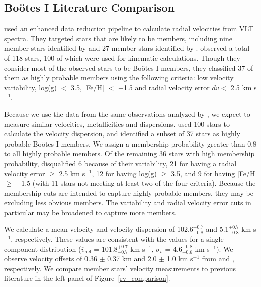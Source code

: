 \documentclass[twocolumn]{aastex63}
\newcommand{\revise}[1]{#1}
\begin{document}
\subsection{Bo{\"o}tes I Literature Comparison}
\label{sec:bootes_literature}
\citet{kop2011} used an enhanced data reduction pipeline to calculate radial velocities from VLT spectra. They targeted stars that are likely to be members, including nine member stars identified by \citet{mun2006} and 27 member stars identified by \citet{Mar2007}. \citet{kop2011} observed a total of 118 stars, 100 of which were used for kinematic calculations. Though they consider most of the observed stars to be Bo{\"o}tes I members, they classified 37 of them as highly probable members using the following criteria: low velocity variability, log(g) $<$ 3.5, [Fe/H] $<$ $-$1.5 and radial velocity error $dv <$ 2.5 km s$^{-1}$. 

Because we use the data from the same observations analyzed by \citet{kop2011}, we expect to measure similar velocities, metallicities and dispersions. \citet{kop2011} used 100 stars to calculate the velocity dispersion, and identified a subset of 37 stars as highly probable Bo{\"o}tes I members. We assign a membership probability greater than 0.8 to all \citet{kop2011} highly probable members. Of the remaining 36 stars with high membership probability, \citet{kop2011} disqualified 6 because of their variability, 21 for having a radial velocity error $\ge$ 2.5 km s$^{-1}$, 12 for having log(g) $\ge$ 3.5, and 9 for having [Fe/H] $\ge$ $-$1.5 (with 11 stars not meeting at least two of the four criteria). Because the \citet{kop2011} membership cuts are intended to capture highly probable members, they may be excluding less obvious members. The variability and radial velocity error cuts in particular may be broadened to capture more members. 

We calculate a mean velocity and velocity dispersion of \revise{102.6$^{+0.7}_{-0.8}$ and 5.1$^{+0.7}_{-0.8}$ km s$^{-1}$}, respectively. These values are consistent with the \citet{kop2011} values for a single-component distribution ($\overline{v}_\mathrm{hel}$ = 101.8$^{+0.7}_{-0.7}$ km s$^{-1}$, $\sigma_v$ = 4.6$^{+0.8}_{-0.6}$ km s$^{-1}$). We observe velocity offsets of 0.36 $\pm$ 0.37 km and 2.0 $\pm$ 1.0 km s$^{-1}$ from \citet{kop2011} and \citet{Mar2007}, respectively. We compare member stars' velocity measurements to previous literature in the left panel of Figure~\ref{rv_comparison}.
\end{document}
